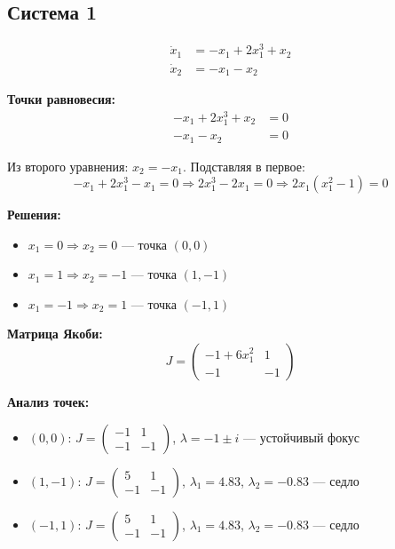 \subsection*{Система 1}

\begin{align}
\dot{x}_1 &= -x_1 + 2x_1^3 + x_2 \\
\dot{x}_2 &= -x_1 - x_2
\end{align}

\textbf{Точки равновесия:}
\begin{align}
-x_1 + 2x_1^3 + x_2 &= 0 \\
-x_1 - x_2 &= 0
\end{align}

Из второго уравнения: $x_2 = -x_1$. Подставляя в первое:
$$-x_1 + 2x_1^3 - x_1 = 0 \Rightarrow 2x_1^3 - 2x_1 = 0 \Rightarrow 2x_1(x_1^2 - 1) = 0$$

\textbf{Решения:}
\begin{itemize}
\item $x_1 = 0 \Rightarrow x_2 = 0$ --- точка $(0, 0)$
\item $x_1 = 1 \Rightarrow x_2 = -1$ --- точка $(1, -1)$
\item $x_1 = -1 \Rightarrow x_2 = 1$ --- точка $(-1, 1)$
\end{itemize}

\textbf{Матрица Якоби:}
$$J = \begin{pmatrix} -1 + 6x_1^2 & 1 \\ -1 & -1 \end{pmatrix}$$

\textbf{Анализ точек:}
\begin{itemize}
\item $(0, 0)$: $J = \begin{pmatrix} -1 & 1 \\ -1 & -1 \end{pmatrix}$, $\lambda = -1 \pm i$ --- устойчивый фокус
\item $(1, -1)$: $J = \begin{pmatrix} 5 & 1 \\ -1 & -1 \end{pmatrix}$, $\lambda_1 = 4.83$, $\lambda_2 = -0.83$ --- седло
\item $(-1, 1)$: $J = \begin{pmatrix} 5 & 1 \\ -1 & -1 \end{pmatrix}$, $\lambda_1 = 4.83$, $\lambda_2 = -0.83$ --- седло
\end{itemize}

